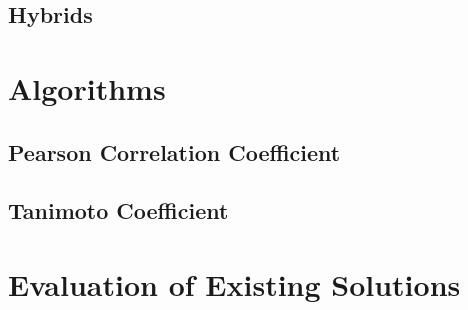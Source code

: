 \subsection{Hybrids}

\section{Algorithms}

\subsection{Pearson Correlation Coefficient}
\subsection{Tanimoto Coefficient}

\section{Evaluation of Existing Solutions}

